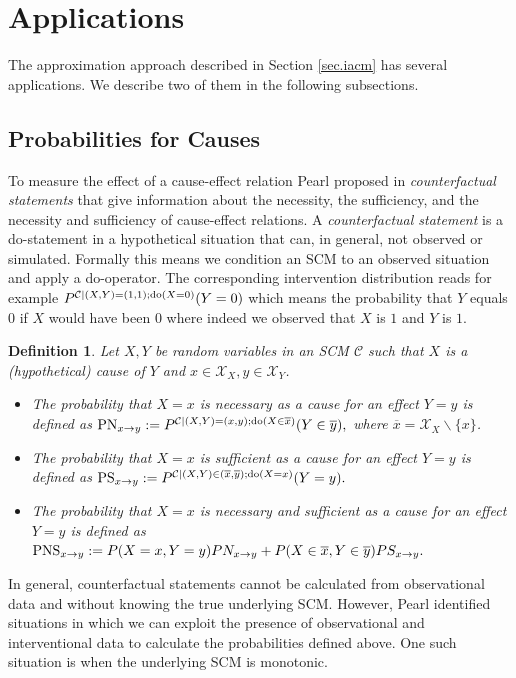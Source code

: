 \documentclass[letterpaper]{article}
\newcommand{\kC}{\mathcal{C}}   %
\newcommand{\kX}{\mathcal{X}}   %
\newtheorem{Def}{Definition}
\newcommand{\DO}{{\rm do}}
\newcommand{\PN}{{\rm PN}}
\newcommand{\PS}{{\rm PS}}
\newcommand{\PNS}{{\rm PNS}}
\begin{document}
\section{Applications} \label{sec.applications}

The approximation approach described in Section \ref{sec.iacm} has several applications. We describe two of them in the following subsections.

\subsection{Probabilities for Causes}

To measure the effect of a cause-effect relation Pearl proposed in \cite{Pea09} {\em counterfactual statements} that give information about the necessity, the sufficiency, and the necessity and sufficiency of cause-effect relations. A {\em counterfactual statement} is a do-statement in a hypothetical situation that can, in general, not observed or simulated. Formally this means we condition an SCM to an observed situation and apply a do-operator. The corresponding intervention distribution reads for example $P^{\kC |(X,Y)=(1,1);\DO{(X=0)}}(Y=0)$ which means the probability that $Y$ equals $0$ if $X$ would have been $0$ where indeed we observed that $X$ is $1$ and $Y$ is $1$.

\begin{Def}
Let $X, Y$ be random variables in an SCM $\kC$ such that $X$ is a (hypothetical) cause of $Y$ and $x \in \kX_X, y \in \kX_Y$.
\begin{itemize}
	\item The probability that $X=x$ is necessary as a cause for an effect $Y=y$ is defined as
	$\PN_{x\rightarrow y} := P^{\kC|(X,Y)=(x,y);\DO(X\in \overline{x})}(Y\in \overline{y}),$
	where $\overline{x} = \kX_X \backslash \{x\}$.
	\item The probability that $X=x$ is sufficient as a cause for an effect $Y=y$ is defined as
	$\PS_{x\rightarrow y} := P^{\kC|(X,Y)\in(\overline{x},\overline{y});\DO(X=x)}(Y=y).$
	\item The probability that $X=x$ is necessary and sufficient as a cause for an effect $Y=y$ is defined as $\PNS_{x\rightarrow y} := P(X=x,Y=y) PN_{x\rightarrow y} + P(X\in \overline{x},Y\in \overline{y})PS_{x\rightarrow y}.$
\end{itemize}
\end{Def}

In general, counterfactual statements cannot be calculated from observational data and without knowing the true underlying SCM. However, Pearl identified situations in which we can exploit the presence of observational and interventional data to calculate the probabilities defined above. One such situation is when the underlying SCM is monotonic.
\end{document}
